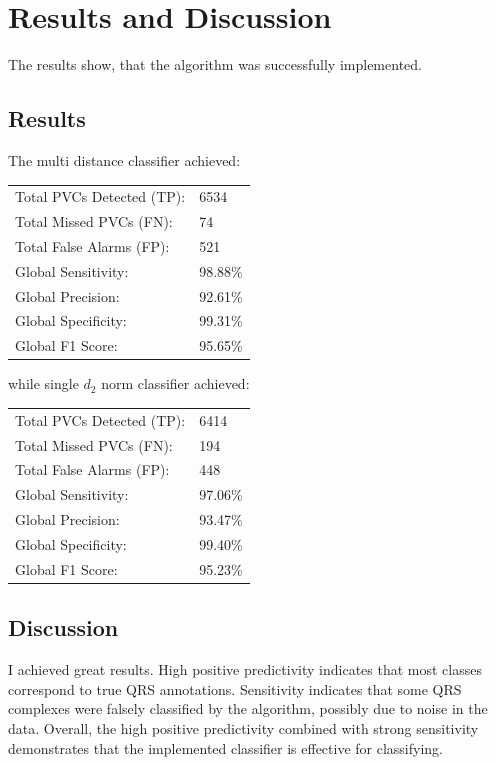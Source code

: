 \documentclass[conference]{IEEEtran}
\begin{document}
\section{Results and Discussion}
The results show, that the algorithm was successfully implemented.

\subsection{Results}

The multi distance classifier achieved:

\begin{tabular}{l l}
Total PVCs Detected (TP): & 6534 \\
Total Missed PVCs (FN): & 74 \\
Total False Alarms (FP): & 521 \\
\hline
Global Sensitivity: & 98.88\% \\
Global Precision: & 92.61\% \\
Global Specificity: & 99.31\% \\
Global F1 Score: & 95.65\%
\end{tabular}

while single $d_2$ norm classifier achieved:

\begin{tabular}{l l}
Total PVCs Detected (TP): & 6414 \\
Total Missed PVCs (FN): & 194 \\
Total False Alarms (FP): & 448 \\
\hline
Global Sensitivity: & 97.06\% \\
Global Precision: & 93.47\% \\
Global Specificity: & 99.40\% \\
Global F1 Score: & 95.23\%
\end{tabular}

\subsection{Discussion}
I achieved great results. High positive predictivity indicates that most classes correspond to true QRS annotations. Sensitivity indicates that some QRS complexes were falsely classified by the algorithm, possibly due to noise in the data. Overall, the high positive predictivity combined with strong sensitivity demonstrates that the implemented classifier is effective for classifying.
\end{document}
